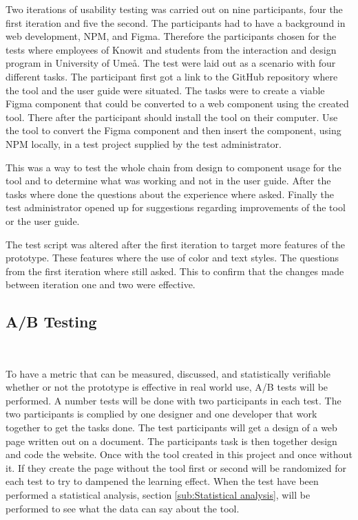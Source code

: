 Two iterations of usability testing was carried out on nine participants, four the first iteration and five the second. The participants had to have a background in web development, NPM, and Figma.  Therefore the participants chosen for the tests where employees of Knowit and students from the interaction and design program in University of Umeå. The test were laid out as a scenario with four different tasks. The participant first got a link to the GitHub repository where the tool and the user guide were situated. The tasks were to create a viable Figma component that could be converted to a web component using the created tool. There after the participant should install the tool on their computer. Use the tool to convert the Figma component and then insert the component, using NPM locally, in a test project supplied by the test administrator.

This was a way to test the whole chain from design to component usage for the tool and to determine what was working and not in the user guide. After the tasks where done the questions about the experience where asked. Finally the test administrator opened up for suggestions regarding improvements of the tool or the user guide. 

The test script was altered after the first iteration to target more features of the prototype. These features where the use of color and text styles. The questions from the first iteration where still asked. This to confirm that the changes made between iteration one and two were effective. 


\subsection{ A/B Testing }%
\label{sub:ab-testing}

\\

To have a metric that can be measured, discussed, and statistically verifiable whether or not the prototype is effective in real world use, A/B tests will be performed. A number tests will be done with two participants in each test. The two participants is complied by one designer and one developer that work together to get the tasks done. The test participants will get a design of a web page written out on a document. The participants task is then together design and code the website. Once with the tool created in this project and once without it. If they create the page without the tool first or second will be randomized for each test to try to dampened the learning effect. When the test have been performed a statistical analysis, section \ref{sub:Statistical analysis}, will be performed to see what the data can say about the tool.

